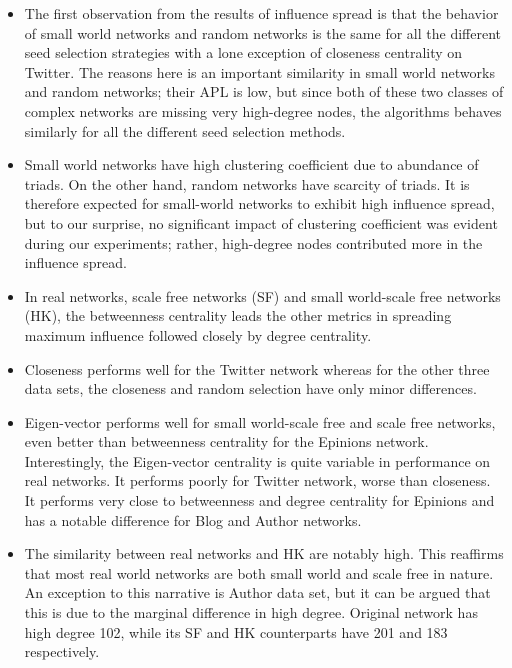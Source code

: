 		\begin{itemize}
			\item The first observation from the results of influence spread is that the behavior of small world networks and random networks is the same for all the different seed selection strategies with a lone exception of closeness centrality on Twitter. The reasons here is an important similarity in small world networks and random networks; their APL is low, but since both of these two classes of complex networks are missing very high-degree nodes, the algorithms behaves similarly for all the different seed selection methods.
			
			\item Small world networks have high clustering coefficient due to abundance of triads. On the other hand, random networks have scarcity of triads. It is therefore expected for small-world networks to exhibit high influence spread, but to our surprise, no significant impact of clustering coefficient was evident during our experiments; rather, high-degree nodes contributed more in the influence spread.
			
			\item In real networks, scale free networks (SF) and small world-scale free networks (HK), the betweenness centrality leads the other metrics in spreading maximum influence followed closely by degree centrality.
			
			\item Closeness performs well for the Twitter network whereas for the other three data sets, the closeness and random selection have only minor differences.
			
			\item Eigen-vector performs well for small world-scale free and scale free networks, even better than betweenness centrality for the Epinions network. Interestingly, the Eigen-vector centrality is quite variable in performance on real networks. It performs poorly for Twitter network, worse than closeness. It performs very close to betweenness and degree centrality for Epinions and has a notable difference for Blog and Author networks.
			
			\item The similarity between real networks and HK are notably high. This reaffirms that most real world networks are both small world and scale free in nature. An exception to this narrative is Author data set, but it can be argued that this is due to the marginal difference in high degree. Original network has high degree 102, while its SF and HK counterparts have 201 and 183 respectively.
			

\end{itemize}
